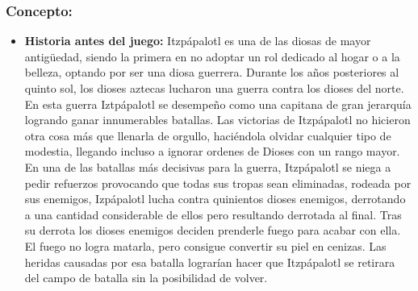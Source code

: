 \documentclass[11pt,letterpaper]{article}
\begin{document}
\subsubsection{Concepto:}
\begin{itemize}
	\item \textbf{Historia antes del juego:}
	Itzpápalotl es una de las diosas de mayor antigüedad, siendo la primera en no adoptar un rol dedicado al hogar o a la belleza, optando por ser una diosa guerrera.
	Durante los años posteriores al quinto sol, los dioses aztecas lucharon una guerra contra los dioses del norte. En esta guerra Iztpápalotl se desempeño como una capitana de gran jerarquía logrando ganar innumerables batallas. Las victorias de Itzpápalotl no hicieron otra cosa más que llenarla de orgullo, haciéndola olvidar cualquier tipo de modestia, llegando incluso a ignorar ordenes de Dioses con un rango mayor. En una de las batallas más decisivas para la guerra, Itzpápalotl se niega a pedir refuerzos provocando que todas sus tropas sean eliminadas, rodeada por sus enemigos, Izpápalotl lucha contra quinientos dioses enemigos, derrotando a una cantidad considerable de ellos pero resultando derrotada al final. Tras su derrota los dioses enemigos deciden prenderle fuego para acabar con ella. El fuego no logra matarla, pero consigue convertir su piel en cenizas. Las heridas causadas por esa batalla lograrían hacer que Itzpápalotl se retirara del campo de batalla sin la posibilidad de volver.
	

\end{itemize}
\end{document}
